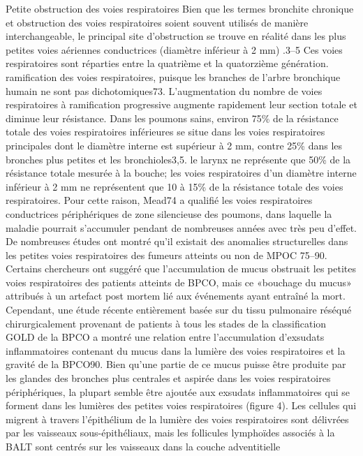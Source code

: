 \documentclass[12pt,]{article}
\begin{document}
Petite obstruction des voies respiratoires Bien que les termes bronchite
chronique et obstruction des voies respiratoires soient souvent utilisés
de manière interchangeable, le principal site d'obstruction se trouve en
réalité dans les plus petites voies aériennes conductrices (diamètre
inférieur à 2 mm) .3--5 Ces voies respiratoires sont réparties entre la
quatrième et la quatorzième génération. ramification des voies
respiratoires, puisque les branches de l'arbre bronchique humain ne sont
pas dichotomiques73. L'augmentation du nombre de voies respiratoires à
ramification progressive augmente rapidement leur section totale et
diminue leur résistance. Dans les poumons sains, environ 75\% de la
résistance totale des voies respiratoires inférieures se situe dans les
voies respiratoires principales dont le diamètre interne est supérieur à
2 mm, contre 25\% dans les bronches plus petites et les bronchioles3,5.
le larynx ne représente que 50\% de la résistance totale mesurée à la
bouche; les voies respiratoires d'un diamètre interne inférieur à 2 mm
ne représentent que 10 à 15\% de la résistance totale des voies
respiratoires. Pour cette raison, Mead74 a qualifié les voies
respiratoires conductrices périphériques de zone silencieuse des
poumons, dans laquelle la maladie pourrait s'accumuler pendant de
nombreuses années avec très peu d'effet. De nombreuses études ont montré
qu'il existait des anomalies structurelles dans les petites voies
respiratoires des fumeurs atteints ou non de MPOC 75--90. Certains
chercheurs ont suggéré que l'accumulation de mucus obstruait les petites
voies respiratoires des patients atteints de BPCO, mais ce «bouchage du
mucus» attribués à un artefact post mortem lié aux événements ayant
entraîné la mort. Cependant, une étude récente entièrement basée sur du
tissu pulmonaire réséqué chirurgicalement provenant de patients à tous
les stades de la classification GOLD de la BPCO a montré une relation
entre l'accumulation d'exsudats inflammatoires contenant du mucus dans
la lumière des voies respiratoires et la gravité de la BPCO90. Bien
qu'une partie de ce mucus puisse être produite par les glandes des
bronches plus centrales et aspirée dans les voies respiratoires
périphériques, la plupart semble être ajoutée aux exsudats
inflammatoires qui se forment dans les lumières des petites voies
respiratoires (figure 4). Les cellules qui migrent à travers
l'épithélium de la lumière des voies respiratoires sont délivrées par
les vaisseaux sous-épithéliaux, mais les follicules lymphoïdes associés
à la BALT sont centrés sur les vaisseaux dans la couche adventitielle
\end{document}
